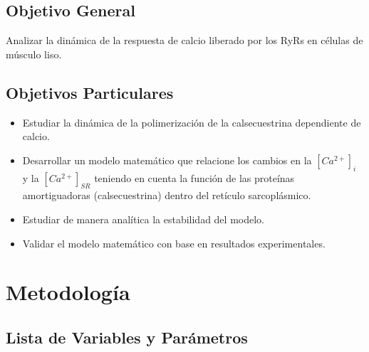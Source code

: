 \documentclass[draft]{article}
\newcommand{\Cai}{[Ca^{2+}]_{i}}
\newcommand{\Cal}{[Ca^{2+}]_{SR}}
\begin{document}
\subsection{Objetivo General}

Analizar la dinámica de la respuesta de calcio liberado por los RyRs en células de músculo liso.

\subsection{Objetivos Particulares}

\begin{itemize}
	\item Estudiar la dinámica de la polimerización de la calsecuestrina dependiente de calcio. \\
	
	\item Desarrollar un modelo matemático que relacione los cambios en la $\Cai$ y la $\Cal$ teniendo en cuenta la función de las proteínas amortiguadoras (calsecuestrina) dentro del retículo sarcoplásmico. \\
	
	\item Estudiar de manera analítica la estabilidad del modelo. \\
	
	\item Validar el modelo matemático con base en resultados experimentales.
\end{itemize}

\section{Metodología}

\subsection*{Lista de Variables y Parámetros}
\end{document}
